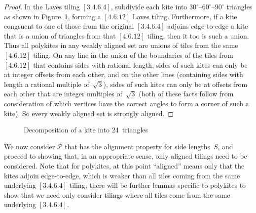 \begin{proof}
In the Laves tiling $[3.4.6.4]$, subdivide each kite into
$30^\circ$--$60^\circ$--$90^\circ$ triangles as shown in
Figure~\ref{fig:kitedecomp24}, forming a $[4.6.12]$
Laves tiling.  Furthermore, if a kite congruent to
one of those from the original $[3.4.6.4]$ adjoins edge-to-edge a kite
that is a union of triangles from that $[4.6.12]$ tiling, then it too
is such a union.  Thus all polykites
in any weakly aligned set are unions of tiles from the same $[4.6.12]$
tiling.  On any line in the union of the boundaries of the tiles from
$[4.6.12]$ that contains sides with rational length, sides of such
kites can only be at integer offsets from each other, and on the other
lines (containing sides with length a rational multiple
of~$\sqrt{3}$), sides of such kites can only be at offsets from each
other that are integer multiples of~$\sqrt{3}$ (both of these facts
follow from consideration of which vertices have the correct angles to
form a corner of such a kite).  So every weakly aligned set is
strongly aligned.
\end{proof}

\begin{figure}[htp!]
\begin{center}
\end{center}
\caption{Decomposition of a kite into $24$~triangles}
\label{fig:kitedecomp24}
\end{figure}

We now consider $\mathcal{P}$ that has the alignment property for side
lengths~$S$, and proceed to showing that, in an appropriate
sense, only aligned tilings need to be considered.  Note that for
polykites, at this point ``aligned'' means only that the kites adjoin
edge-to-edge, which is weaker than all tiles coming from the same
underlying $[3.4.6.4]$ tiling; there will be further lemmas specific
to polykites to show that we need only consider tilings where all
tiles come from the same underlying $[3.4.6.4]$.

